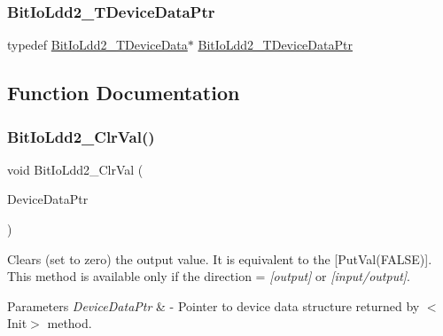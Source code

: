 \subsubsection{\texorpdfstring{Bit\+Io\+Ldd2\+\_\+\+T\+Device\+Data\+Ptr}{BitIoLdd2\_TDeviceDataPtr}}
{\footnotesize\ttfamily typedef \hyperlink{struct_bit_io_ldd2___t_device_data}{Bit\+Io\+Ldd2\+\_\+\+T\+Device\+Data}$\ast$ \hyperlink{group___bit_io_ldd2__module_ga58ccd058cbac67111c82dca4fa83692b}{Bit\+Io\+Ldd2\+\_\+\+T\+Device\+Data\+Ptr}}



\subsection{Function Documentation}
\mbox{\label{group___bit_io_ldd2__module_ga544e4e9c98ec5fa4934bcac68c17d303}} 
\subsubsection{\texorpdfstring{Bit\+Io\+Ldd2\+\_\+\+Clr\+Val()}{BitIoLdd2\_ClrVal()}}
{\footnotesize\ttfamily void Bit\+Io\+Ldd2\+\_\+\+Clr\+Val (\begin{DoxyParamCaption}\item[{\hyperlink{group___p_e___types__module_gac5cf1362f1f0e3a2ce71b1bf2276d091}{L\+D\+D\+\_\+\+T\+Device\+Data} $\ast$}]{Device\+Data\+Ptr }\end{DoxyParamCaption})}



Clears (set to zero) the output value. It is equivalent to the \mbox{[}Put\+Val(\+F\+A\+L\+S\+E)\mbox{]}. This method is available only if the direction = {\itshape \mbox{[}output\mbox{]}} or {\itshape \mbox{[}input/output\mbox{]}}. 


\begin{DoxyParams}{Parameters}
{\em Device\+Data\+Ptr} & -\/ Pointer to device data structure returned by $<$\+Init$>$ method. \\
\hline
\end{DoxyParams}
\mbox{\label{group___bit_io_ldd2__module_gab03a5a6cf33499000ac033b999a4f587}} 
